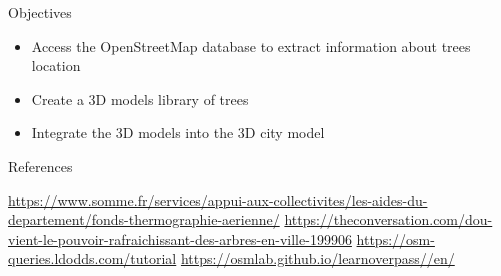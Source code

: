\documentclass[10pt]{beamer}
\begin{document}
\begin{frame}{Objectives}
  \begin{itemize}
    \item<1-> Access the OpenStreetMap database to extract information about trees location
    \item<2-> Create a 3D models library of trees
    \item<3-> Integrate the 3D models into the 3D city model
  \end{itemize}

\end{frame}
\begin{frame}{References}

\begin{thebibliography}{9}
   \url{https://www.somme.fr/services/appui-aux-collectivites/les-aides-du-departement/fonds-thermographie-aerienne/}
   \url{https://theconversation.com/dou-vient-le-pouvoir-rafraichissant-des-arbres-en-ville-199906}
   \url{https://osm-queries.ldodds.com/tutorial}
   \url{https://osmlab.github.io/learnoverpass//en/}
\end{thebibliography}

\end{frame}
\end{document}
